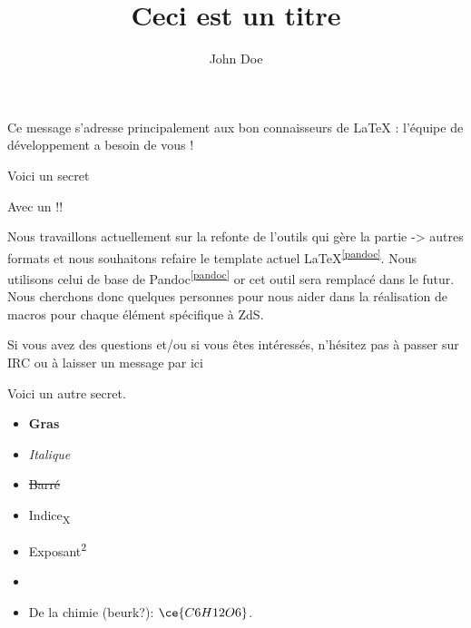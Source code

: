 \documentclass[small]{zmdocument}
\title{Ceci est un titre}
\author{John Doe}
\begin{document}
\maketitle
\tableofcontents
\newpage

\begin{LevelOneIntroduction}
\end{LevelOneIntroduction}

Ce message s’adresse principalement aux bon connaisseurs de LaTeX : l’équipe de développement a besoin de vous ! 

\begin{Spoiler}
   Voici un secret

   Avec un !!
\end{Spoiler}


Nous travaillons actuellement sur la refonte de l’outils qui gère la partie  -> autres formats et nous souhaitons refaire le template actuel LaTeX\textsuperscript{\ref{pandoc}}. Nous utilisons celui de base de Pandoc\textsuperscript{\ref{pandoc}} or cet outil sera remplacé dans le futur. Nous cherchons donc quelques personnes pour nous aider dans la réalisation de macros pour chaque élément spécifique à ZdS.


Si vous avez des questions et/ou si vous êtes intéressés, n’hésitez pas à passer sur IRC ou à laisser un message par ici 

\begin{Spoiler}
Voici un autre secret.
\end{Spoiler}


\begin{itemize}
\item \textbf{Gras}
\item \textit{Italique}
\item \sout{Barré}
\item Indice\textsubscript{X}
\item Exposant\textsuperscript{2}
\item {}
\item De la chimie (beurk?): $\ce{C6H12O6}$.
\end{itemize}
\end{document}
